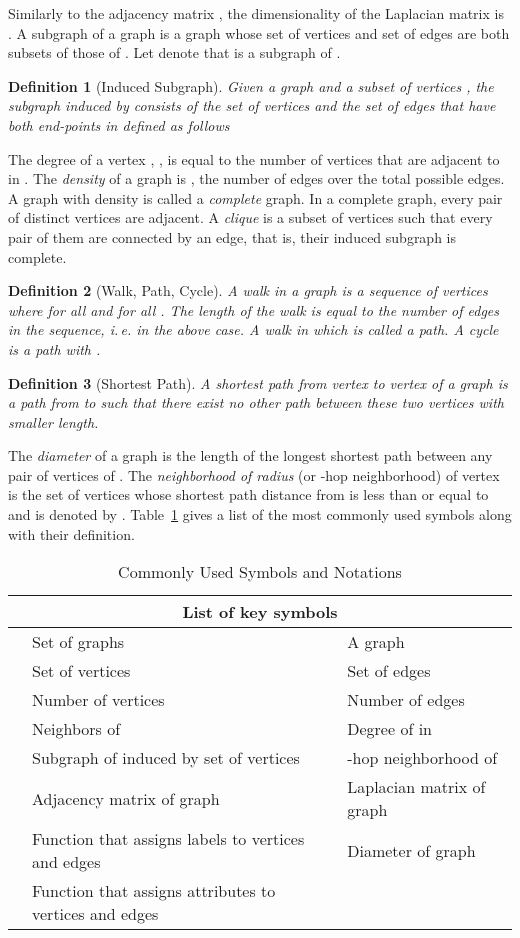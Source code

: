 \documentclass[twoside,11pt]{article}
\newcommand{\ie}{i.\,e. }
\newtheorem{definition}{Definition}
\begin{document}
Similarly to the adjacency matrix , the dimensionality of the Laplacian matrix is .
A subgraph of a graph  is a graph whose set of vertices and set of edges are both subsets of those of .
Let  denote that  is a subgraph of .
\begin{definition}[Induced Subgraph]
    Given a graph  and a subset of vertices , the subgraph  induced by  consists of the set of vertices  and the set of edges  that have both end-points in  defined as follows
    
\end{definition}
The degree of a vertex , , is equal to the number of vertices that are adjacent to  in .
The \textit{density} of a graph  is , the number of edges  over the total possible edges.
A graph  with density  is called a \textit{complete} graph.
In a complete graph, every pair of distinct vertices are adjacent.
A \textit{clique} is a subset of vertices such that every pair of them are connected by an edge, that is, their induced subgraph is complete.
\begin{definition}[Walk, Path, Cycle]
    A walk in a graph  is a sequence of vertices  where  for all  and  for all .
    The length of the walk is equal to the number of edges in the sequence, \ie  in the above case.
    A walk in which  is called a path.
    A cycle is a path with .
\end{definition}
\begin{definition}[Shortest Path]
    A shortest path from vertex  to vertex  of a graph  is a path from  to  such that there exist no other path between these two vertices with smaller length.
\end{definition}
The \textit{diameter} of a graph  is the length of the longest shortest path between any pair of vertices of .
The \textit{neighborhood of radius}  (or -hop neighborhood) of vertex  is the set of vertices whose shortest path distance from  is less than or equal to  and is denoted
by .
Table~\ref{tab:symbols} gives a list of the most commonly used symbols along with their definition.
\begin{table}[t]
  \centering
  \footnotesize
  \def\arraystretch{1.1}
  \begin{tabular}{llll} \hline
    \multicolumn{4}{c}{\textbf{List of key symbols}} \\ \hline
     & Set of graphs &  & A graph \\
     & Set of vertices &  & Set of edges \\
     & Number of vertices &  & Number of edges \\
     & Neighbors of  &  & Degree of  in  \\
     & Subgraph of  induced by set of vertices  &  & -hop neighborhood of  \\
     & Adjacency matrix of graph &  & Laplacian matrix of graph \\
     & Function that assigns labels to vertices and edges &  & Diameter of graph \\ 
     & Function that assigns attributes to vertices and edges \\ \hline
  \end{tabular}
  \caption{Commonly Used Symbols and Notations}
  \label{tab:symbols}
\end{table}
\end{document}
